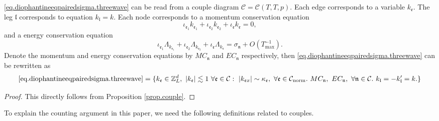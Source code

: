 \begin{prop}\label{prop.couple'}
\eqref{eq.diophantineeqpairedsigma.threewave} can be read from a couple diagram $\mathcal{C}=\mathcal{C}(T,T,p)$. Each edge corresponds to a variable $k_{\mathfrak{e}}$. The leg $\mathfrak{l}$ corresponds to equation $k_{\mathfrak{l}}=k$. Each node corresponds to a momentum conservation equation
\begin{equation}\label{eq.momentumconservationunit.threewave}
    \iota_{\mathfrak{e}_1}k_{\mathfrak{e}_1}+\iota_{\mathfrak{e}_2}k_{\mathfrak{e}_2}+\iota_{\mathfrak{e}}k_{\mathfrak{e}}=0,
\end{equation} 
and a energy conservation equation 
\begin{equation}\label{eq.energyconservationunit.threewave}
    \iota_{\mathfrak{e}_1}\Lambda_{k_{\mathfrak{e}_1}}+\iota_{\mathfrak{e}_2}\Lambda_{k_{\mathfrak{e}_2}}+\iota_{\mathfrak{e}}\Lambda_{k_{\mathfrak{e}}} = \sigma_{\mathfrak{n}} + O(T^{-1}_{\text{max}}).
\end{equation}  
Denote the momentum and energy conservation equations by $MC_{\mathfrak{n}}$ and $EC_{\mathfrak{n}}$ respectively, then \eqref{eq.diophantineeqpairedsigma.threewave} can be rewritten as 
\begin{equation}\label{eq.diophantineeqpairedsigma'.threewave}
    \text{\eqref{eq.diophantineeqpairedsigma.threewave}}=\{k_{\mathfrak{e}}\in \mathbb{Z}^d_L,\ |k_{\mathfrak{e}}|\lesssim 1\ \forall \mathfrak{e}\in \mathcal{C}:\  |k_{\mathfrak{e}x}| \sim \kappa_{\mathfrak{e}},\ \forall \mathfrak{e}\in \mathcal{C}_{\text{norm}}.\ MC_{\mathfrak{n}},\  EC_{\mathfrak{n}},\ \forall \mathfrak{n}\in \mathcal{C}.\ k_{\mathfrak{l}} = - k_{\mathfrak{l}}'= k.\}
\end{equation}
\end{prop}
\begin{proof}
This directly follows from Proposition \ref{prop.couple}. 
\end{proof}

To explain the counting argument in this paper, we need the following definitions related to couples.

